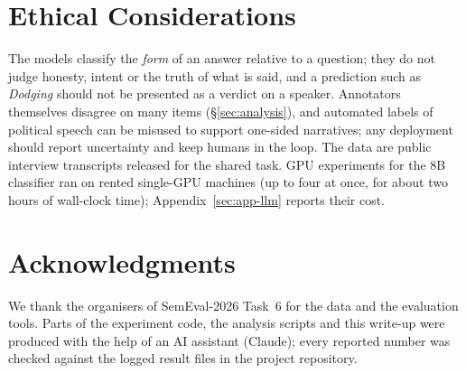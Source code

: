 \section*{Ethical Considerations}

The models classify the \emph{form} of an answer relative to a question; they do not judge honesty, intent or the truth of what is said, and a prediction such as \emph{Dodging} should not be presented as a verdict on a speaker.
Annotators themselves disagree on many items (\S\ref{sec:analysis}), and automated labels of political speech can be misused to support one-sided narratives; any deployment should report uncertainty and keep humans in the loop.
The data are public interview transcripts released for the shared task.
GPU experiments for the 8B classifier ran on rented single-GPU machines (up to four at once, for about two hours of wall-clock time); Appendix~\ref{sec:app-llm} reports their cost.

\section*{Acknowledgments}

We thank the organisers of SemEval-2026 Task~6 for the data and the evaluation tools.
Parts of the experiment code, the analysis scripts and this write-up were produced with the help of an AI assistant (Claude); every reported number was checked against the logged result files in the project repository.
